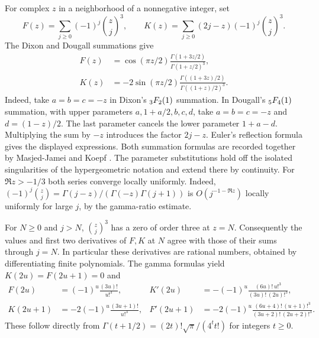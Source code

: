 \documentclass[11pt,a4paper]{article}
\begin{document}
For complex $z$ in a neighborhood of a nonnegative integer, set
\[
 F(z)=\sum_{j\geq0}(-1)^j\binom zj^3,\qquad
 K(z)=\sum_{j\geq0}(2j-z)(-1)^j\binom zj^3.
\]
The Dixon and Dougall summations give
\begin{align}
 F(z)&=\cos(\pi z/2)\frac{\Gamma(1+3z/2)}{\Gamma(1+z/2)^3},\label{eq:suncubic-dixon}\\
 K(z)&=-2\sin(\pi z/2)\frac{\Gamma((1+3z)/2)}{\Gamma((1+z)/2)^3}.\label{eq:suncubic-dougall}
\end{align}
Indeed, take $a=b=c=-z$ in Dixon's $\mathstrut{}_3F_2(1)$ summation.
In Dougall's $\mathstrut{}_5F_4(1)$ summation, with upper parameters
$a,1+a/2,b,c,d$, take $a=b=c=-z$ and $d=(1-z)/2$.
The last parameter cancels the lower parameter $1+a-d$. Multiplying the sum by $-z$ introduces the factor $2j-z$.
Euler's reflection formula gives the displayed expressions.
Both summation formulas are recorded together by Masjed-Jamei and Koepf
\cite[eqs.~(8), (13)]{masjedkoepf}.
The parameter substitutions hold off the isolated singularities of the hypergeometric notation and extend there by continuity.
For $\Re z>-1/3$ both series converge locally uniformly. Indeed,
$(-1)^j\binom zj=\Gamma(j-z)/(\Gamma(-z)\Gamma(j+1))$ is
$O(j^{-1-\Re z})$ locally uniformly for large $j$, by the gamma-ratio estimate.

For $N\ge0$ and $j>N$, $\binom zj^3$ has a zero of order three at $z=N$.
Consequently the values and first two derivatives of $F,K$ at $N$ agree with those of their sums through $j=N$.
In particular these derivatives are rational numbers, obtained by differentiating finite polynomials.
The gamma formulas yield $K(2u)=F(2u+1)=0$ and
\begin{align*}
 F(2u)&=(-1)^u\frac{(3u)!}{u!^3},&
 K'(2u)&=-(-1)^u\frac{(6u)!\,u!^3}{(3u)!\,(2u)!^3},\\
 K(2u+1)&=-2(-1)^u\frac{(3u+1)!}{u!^3},&
 F'(2u+1)&=-2(-1)^u\frac{(6u+4)!\,(u+1)!^3}{(3u+2)!\,(2u+2)!^3}.
\end{align*}
These follow directly from $\Gamma(t+1/2)=(2t)!\sqrt\pi/(4^t t!)$ for integers $t\geq0$.
\end{document}
